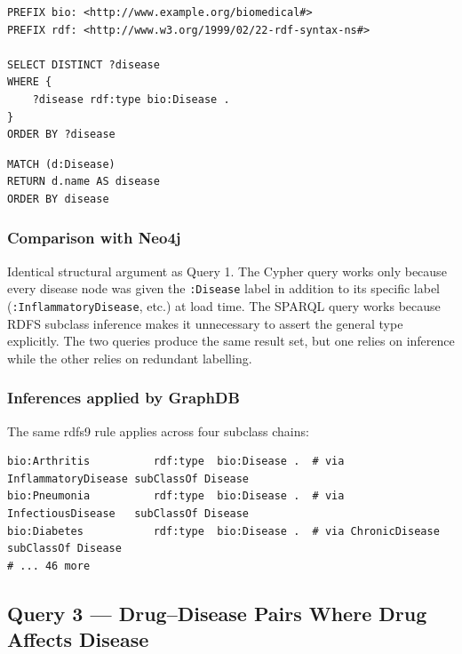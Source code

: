 \documentclass[11pt,a4paper]{article}
\begin{document}
\begin{lstlisting}[style=sparql, caption={SPARQL: list all diseases.}]
PREFIX bio: <http://www.example.org/biomedical#>
PREFIX rdf: <http://www.w3.org/1999/02/22-rdf-syntax-ns#>

SELECT DISTINCT ?disease
WHERE {
    ?disease rdf:type bio:Disease .
}
ORDER BY ?disease
\end{lstlisting}

\begin{lstlisting}[style=cypher, caption={Cypher equivalent: list all diseases.}]
MATCH (d:Disease)
RETURN d.name AS disease
ORDER BY disease
\end{lstlisting}

\subsubsection*{Comparison with Neo4j}

Identical structural argument as Query 1.  The Cypher query works only because
every disease node was given the \texttt{:Disease} label in addition to its
specific label (\texttt{:InflammatoryDisease}, etc.) at load time.  The SPARQL
query works because RDFS subclass inference makes it unnecessary to assert the
general type explicitly.  The two queries produce the same result set, but
one relies on inference while the other relies on redundant labelling.

\subsubsection*{Inferences applied by GraphDB}

The same rdfs9 rule applies across four subclass chains:

\begin{lstlisting}[style=turtle]
bio:Arthritis          rdf:type  bio:Disease .  # via InflammatoryDisease subClassOf Disease
bio:Pneumonia          rdf:type  bio:Disease .  # via InfectiousDisease   subClassOf Disease
bio:Diabetes           rdf:type  bio:Disease .  # via ChronicDisease      subClassOf Disease
# ... 46 more
\end{lstlisting}


\subsection{Query 3 — Drug–Disease Pairs Where Drug Affects Disease}
\end{document}
